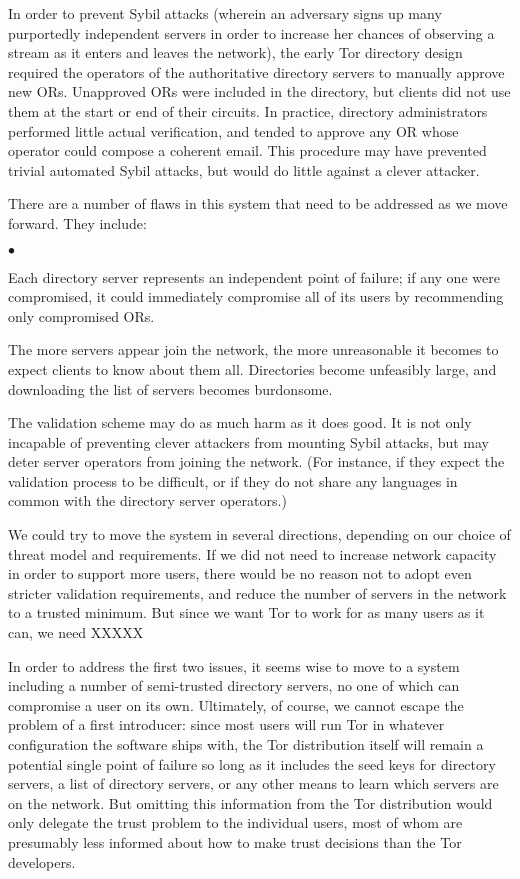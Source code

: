 \documentclass{llncs}
\newenvironment{tightlist}{\begin{list}{$\bullet$}{
  \setlength{\itemsep}{0mm}
    \setlength{\parsep}{0mm}
    }}{\end{list}}
\begin{document}
In order to prevent Sybil attacks (wherein an adversary signs up many
purportedly independent servers in order to increase her chances of observing
a stream as it enters and leaves the network), the early Tor directory design
required the operators of the authoritative directory servers to manually
approve new ORs.  Unapproved ORs were included in the directory, but clients
did not use them at the start or end of their circuits.  In practice,
directory administrators performed little actual verification, and tended to
approve any OR whose operator could compose a coherent email.  This procedure
may have prevented trivial automated Sybil attacks, but would do little
against a clever attacker.

There are a number of flaws in this system that need to be addressed as we
move forward.  They include:
\begin{tightlist}
\item Each directory server represents an independent point of failure; if
  any one were compromised, it could immediately compromise all of its users
  by recommending only compromised ORs.
\item The more servers appear join the network, the more unreasonable it
  becomes to expect clients to know about them all.  Directories
  become unfeasibly large, and downloading the list of servers becomes
  burdonsome.
\item The validation scheme may do as much harm as it does good.  It is not
  only incapable of preventing clever attackers from mounting Sybil attacks,
  but may deter server operators from joining the network.  (For instance, if
  they expect the validation process to be difficult, or if they do not share
  any languages in common with the directory server operators.)
\end{tightlist}

We could try to move the system in several directions, depending on our
choice of threat model and requirements.  If we did not need to increase
network capacity in order to support more users, there would be no reason not
to adopt even stricter validation requirements, and reduce the number of
servers in the network to a trusted minimum.  But since we want Tor to work
for as many users as it can, we need XXXXX

In order to address the first two issues, it seems wise to move to a system
including a number of semi-trusted directory servers, no one of which can
compromise a user on its own.  Ultimately, of course, we cannot escape the
problem of a first introducer: since most users will run Tor in whatever
configuration the software ships with, the Tor distribution itself will
remain a potential single point of failure so long as it includes the seed
keys for directory servers, a list of directory servers, or any other means
to learn which servers are on the network.  But omitting this information
from the Tor distribution would only delegate the trust problem to the
individual users, most of whom are presumably less informed about how to make
trust decisions than the Tor developers.
\end{document}
